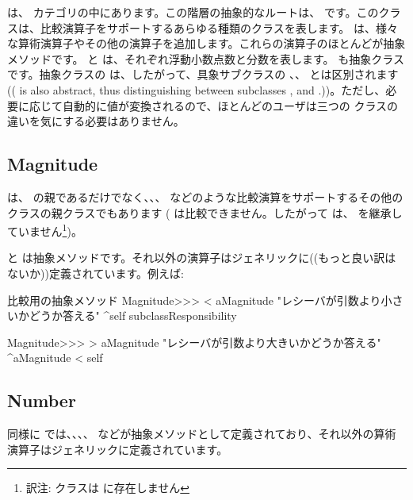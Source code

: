 \documentclass[a4paper,10pt,twoside]{book}
\begin{document}
 は、 カテゴリの中にあります。この階層の抽象的なルートは、 です。このクラスは、比較演算子をサポートするあらゆる種類のクラスを表します。 は、様々な算術演算子やその他の演算子を追加します。これらの演算子のほとんどが抽象メソッドです。 と  は、それぞれ浮動小数点数と分数を表します。 も抽象クラスです。抽象クラスの  は、したがって、具象サブクラスの 、、 とは区別されます (( is also abstract, thus distinguishing between subclasses ,  and .))。ただし、必要に応じて自動的に値が変換されるので、ほとんどのユーザは三つの  クラスの違いを気にする必要はありません。

\subsection{Magnitude}

 は、 の親であるだけでなく、、、 などのような比較演算をサポートするその他のクラスの親クラスでもあります ( は比較できません。したがって  は、 を継承していません\footnote{訳注:  クラスは  に存在しません})。

 と  は抽象メソッドです。それ以外の演算子はジェネリックに((もっと良い訳はないか))定義されています。例えば:

\begin{method}{比較用の抽象メソッド}
Magnitude>>> < aMagnitude 
    "レシーバが引数より小さいかどうか答える"
    ^self subclassResponsibility

Magnitude>>> > aMagnitude 
    "レシーバが引数より大きいかどうか答える"
    ^aMagnitude < self
\end{method}

\subsection{Number}

同様に  では、、、、 などが抽象メソッドとして定義されており、それ以外の算術演算子はジェネリックに定義されています。
\end{document}

